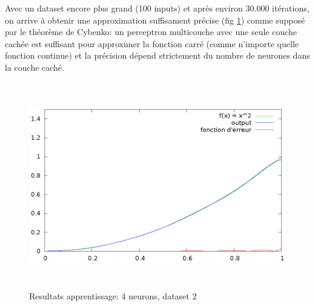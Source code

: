 \documentclass[twoside,openright,a4paper,11pt,french]{article}
\begin{document}
Avec un dataset encore plus grand (100 inputs) et après environ
30.000 itérations, on arrive à obtenir une approximation suffisament
précise (fig \ref{fig:chartsqtest5}) comme supposé par le théorème de Cybenko:
un perceptron multicouche avec une seule couche cachée est suffisant pour
approximer la fonction carré (comme n'importe quelle fonction continue) 
et la précision dépend strictement du nombre de neurones dans la couche caché.

\begin{figure}[ht]
\centering
\includegraphics[width=12cm,height=9cm]{./pics/chartsqtest5.eps}
\caption{Resultats apprentissage: 4 neurons, dataset 2}
\label{fig:chartsqtest5}
\end{figure}


\clearpage
{}


\end{document}

